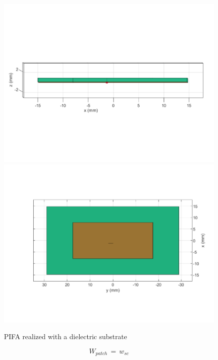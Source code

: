 \documentclass[12pt,a4paper]{article}
\begin{document}
{\begin{figure}[h]
\begin{center}
\includegraphics[scale=0.35]{patch_structure_2.pdf}
\includegraphics[scale=0.35]{patch_structure_3.pdf}
\end{center}
\caption{PIFA realized with a dielectric substrate}
\label{fig:patch_structure}
\end{figure}
\begin{multicols}{2}
\begin{equation}
	W_{patch}\,=\,w_{sc}
	\label{eq:shorting condition}
\end{equation}
	\begin{table}[h]
		\begin{center}
			{\selectfont
\begin{tabular}{||m{5cm}|m{5cm}||}

\end{tabular}}
\end{center}
\end{table}
\end{multicols}}
\end{document}
